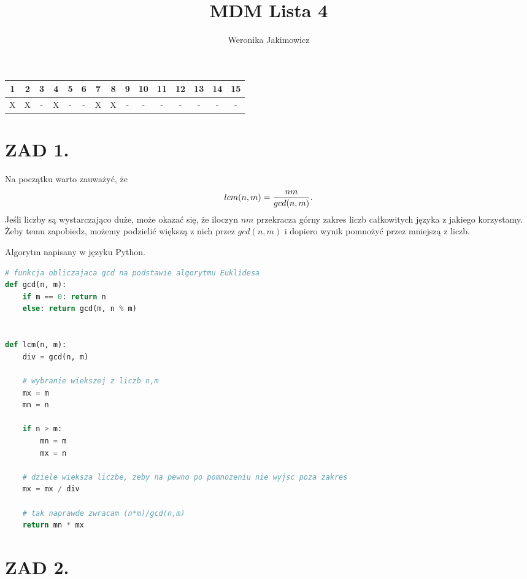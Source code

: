 \documentclass{article}[13pt]
\author{Weronika Jakimowicz}
\title{MDM Lista 4}
\date{}
\begin{document}
\maketitle

\begin{center}
    \begin{tabular}{| c | c | c | c | c | c | c | c | c | c | c | c | c | c | c |}
        \hline

        1 & 2 & 3 & 4 & 5 & 6 & 7 & 8 & 9 & 10 & 11 & 12 & 13 & 14 & 15\\

        \hline

        X & X & - & X & - & - & X & X & - & -  & -  & -  & -  & -  & - \\
        
        \hline
    \end{tabular}
\end{center}

\section*{ZAD 1.}

Na początku warto zauważyć, że
$$lcm(n,m)={nm\over gcd(n,m)}.$$
Jeśli liczby są wystarczająco duże, może okazać się, że iloczyn $nm$ przekracza górny zakres liczb całkowitych języka z jakiego korzystamy. Żeby temu zapobiedz, możemy podzielić większą z nich przez $gcd(n,m)$ i dopiero wynik pomnożyć przez mniejszą z liczb.

Algorytm napisany w języku Python.

\begin{lstlisting}[language=Python]
# funkcja obliczajaca gcd na podstawie algorytmu Euklidesa
def gcd(n, m):
    if m == 0: return n
    else: return gcd(m, n % m)


def lcm(n, m):
    div = gcd(n, m)

    # wybranie wiekszej z liczb n,m
    mx = m
    mn = n

    if n > m:
        mn = m
        mx = n

    # dziele wieksza liczbe, zeby na pewno po pomnozeniu nie wyjsc poza zakres
    mx = mx / div

    # tak naprawde zwracam (n*m)/gcd(n,m)
    return mn * mx
\end{lstlisting}

\section*{ZAD 2.}
\end{document}
